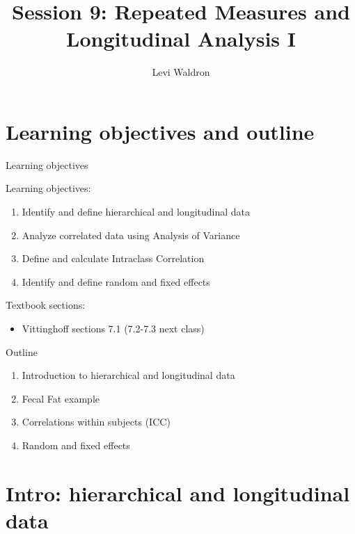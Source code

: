 \documentclass[
  ignorenonframetext,
]{beamer}
\title{Session 9: Repeated Measures and Longitudinal Analysis I}
\author{Levi Waldron}
\date{}
\institute{CUNY SPH Biostatistics 2}
\providecommand{\tightlist}{%
  \setlength{\itemsep}{0pt}\setlength{\parskip}{0pt}}
\begin{document}
\frame{\titlepage}

\hypertarget{learning-objectives-and-outline}{%
\section{Learning objectives and
outline}\label{learning-objectives-and-outline}}

\begin{frame}{Learning objectives}
\protect\hypertarget{learning-objectives}{}

Learning objectives:

\begin{enumerate}
\tightlist
\item
  Identify and define hierarchical and longitudinal data
\item
  Analyze correlated data using Analysis of Variance
\item
  Define and calculate Intraclass Correlation
\item
  Identify and define random and fixed effects
\end{enumerate}

Textbook sections:

\begin{itemize}
\tightlist
\item
  Vittinghoff sections 7.1 (7.2-7.3 next class)
\end{itemize}

\end{frame}

\begin{frame}{Outline}
\protect\hypertarget{outline}{}

\begin{enumerate}
\tightlist
\item
  Introduction to hierarchical and longitudinal data
\item
  Fecal Fat example
\item
  Correlations within subjects (ICC)
\item
  Random and fixed effects
\end{enumerate}

\end{frame}

\hypertarget{intro-hierarchical-and-longitudinal-data}{%
\section{Intro: hierarchical and longitudinal
data}\label{intro-hierarchical-and-longitudinal-data}}
\end{document}
